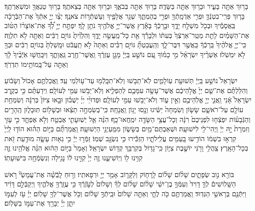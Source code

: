 \documentclass[twoside, openany, parskip=half, 11pt]{book}
\begin{document}
בָּר֥וּךְ 
אַתָּ֖ה בָּעִ֑יר וּבָר֥וּךְ אַתָּ֖ה בַּשָּׂדֶֽה׃ בָּר֥וּךְ אַתָּ֖ה בְּבֹאֶ֑ךָ וּבָר֥וּךְ אַתָּ֖ה בְּצֵאתֶֽךָ׃ בָּר֥וּךְ טַנְאֲךָ֖ וּמִשְׁאַרְתֶּֽךָ׃ בָּר֧וּךְ פְּרִֽי־בִטְנְֿךָ֛ וּפְרִ֥י אַדְמָֽתְֿךָ֖ וּפְרִ֣י בְהֶמְתֶּ֑ךָ שְׁגַ֥ר אֲלָפֶ֖יךָ וְעַשְׁתְּֿר֥וֹת צֹאנֶֽךָ׃ יְצַ֨ו יְיָ֤ אִתְּֿךָ֙ אֶת־הַבְּֿרָכָ֔ה בַּֽאֲסָמֶ֕יךָ וּבְכֹ֖ל מִשְׁלַ֣ח יָדֶ֑ךָ וּבֵ֣רַכְֿךָ֔ בָּאָ֕רֶץ אֲשֶׁר־יְיָ֥ אֱלֹהֶ֖יךָ נֹתֵ֥ן לָֽךְ׃ יִפְתַּ֣ח יְיָ֣ לְ֠ךָ֠ אֶת־אֽוֹצָר֨וֹ הַטּ֜וֹב אֶת־הַשָּׁמַ֗יִם לָתֵ֤ת מְטַֽר־אַרְצְֿךָ֙ בְּעִתּ֔וֹ וּלְבָרֵ֕ךְ אֵ֖ת כָּל־מַֽעֲשֵׂ֣ה יָדֶ֑ךָ וְהִלְוִ֨יתָ֙ גּוֹיִ֣ם רַבִּ֔ים וְאַתָּ֖ה לֹ֥א תִלְוֶֽה׃
 כִּֽי־יְיָ֤ אֱלֹהֶ֨יךָ֙ בֵּֽרַכְֿךָ֔ כַּֽאֲשֶׁ֖ר דִּבֶּר־לָ֑ךְ וְהַֽעֲבַטְתָּ֞ גּוֹיִ֣ם רַבִּ֗ים וְאַתָּה֙ לֹ֣א תַֽעֲבֹ֔ט וּמָֽשַׁלְתָּ֙ בְּגוֹיִ֣ם רַבִּ֔ים וּבְךָ֖ לֹ֥א יִמְשֹֽׁלוּ׃ 
 אַשְׁרֶ֨יךָ
  יִשְׂרָאֵ֜ל מִ֣י כָמ֗וֹךָ עַ֚ם נוֹשַׁ֣ע בַּֽיְיָ֔ מָגֵ֣ן עֶזְרֶ֔ךָ וַֽאֲשֶׁר־חֶ֖רֶב גַּֽאֲוָתֶ֑ךָ וְיִכָּֽחֲשׁ֤וּ אֹֽיְֿבֶ֨יךָ֙ לָ֔ךְ וְאַתָּ֖ה עַל־בָּֽמוֹתֵ֥ימוֹ תִדְרֹֽךְ׃


יִשְׂרָאֵל֙  נוֹשַׁ֣ע בַּֽיְיָ֔ תְּשׁוּעַ֖ת עֽוֹלָמִ֑ים לֹֽא־תֵב֥שׁוּ וְלֹֽא־תִכָּֽלְֿמ֖וּ עַד־ע֥וֹלְמֵי עַֽד׃
וַֽאֲכַלְתֶּ֤ם 
אָכוֹל֙ וְשָׂב֔וֹעַ וְהִלַּלְתֶּ֗ם אֶת־שֵׁ֤ם יְיָ֙ אֱלֹ֣הֵיכֶ֔ם אֲשֶׁר־עָשָׂ֥ה עִמָּכֶ֖ם לְהַפְלִ֑יא וְלֹֽא־יֵבֹ֥שׁוּ עַמִּ֖י לְעוֹלָֽם׃ וִֽידַעְתֶּ֗ם כִּ֣י בְקֶ֤רֶב יִשְׂרָאֵל֙ אָ֔נִי וַֽאֲנִ֛י יְיָ֥ אֱלֹֽהֵיכֶ֖ם וְאֵ֣ין ע֑וֹד וְלֹא־יֵב֥שׁוּ עַמִּ֖י לְעוֹלָֽם׃
וּפְדוּיֵ֨י 
יְיָ֜ יְשֻׁב֗וּן וּבָ֤אוּ צִיּוֹן֙ בְּרִנָּ֔ה וְשִׂמְחַ֥ת עוֹלָ֖ם עַל־רֹאשָׁ֑ם שָׂשׂ֤וֹן וְשִׂמְחָה֙ יַשִּׂ֔יגוּ וְנָ֖סוּ יָג֥וֹן וַֽאֲנָחָֽה׃
 כִּֽי־בְשִׂמְחָ֣ה 
  תֵצֵ֔אוּ וּבְשָׁל֖וֹם תּֽוּבָל֑וּן הֶֽהָרִ֣ים וְהַגְּֿבָע֗וֹת יִפְצְֿח֤וּ לִפְנֵיכֶם֙ רִנָּ֔ה וְכָל־עֲצֵ֥י הַשָּׂדֶ֖ה יִמְֽחֲאוּ־כָֽף׃
הִנֵּ֨ה
 אֵ֧ל יְשֽׁוּעָתִ֛י אֶבְטַ֖ח וְלֹ֣א אֶפְחָ֑ד כִּ֣י עָזִּ֤י וְזִמְרָת֙ יָ֣הּ יְיָ֔ וַֽיְהִי־לִ֖י לִישׁוּעָֽה׃ וּשְׁאַבְתֶּם־מַ֖יִם בְּשָׂשׂ֑וֹן מִמַּֽעַיְנֵ֖י הַיְשׁוּעָֽה׃ וַֽאֲמַרְתֶּ֞ם בַּיּ֣וֹם הַה֗וּא הוֹד֤וּ לַֽיְיָ֙ קִרְא֣וּ בִשְׁמ֔וֹ הוֹדִ֥יעוּ בָֽעַמִּ֖ים עֲלִֽילֹתָ֑יו הַזְכִּ֕ירוּ כִּ֥י נִשְׂגָּ֖ב שְׁמֽוֹ׃ זַמְּֿר֣וּ יְיָ֔ כִּ֥י גֵא֖וּת עָשָׂ֑ה מוּדַ֥עַת זֹ֖את בְּכָל־הָאָֽרֶץ׃ צַֽהֲלִ֥י וָרֹ֖נִּי יוֹשֶׁ֣בֶת צִיּ֑וֹן כִּֽי־גָד֥וֹל בְּקִרְבֵּ֖ךְ קְד֥וֹשׁ יִשְׂרָאֵֽל׃
וְאָמַר֙
 בַּיּ֣וֹם הַה֔וּא הִנֵּ֨ה אֱלֹהֵ֥ינוּ זֶ֛ה קִוִּ֥ינוּ ל֖וֹ וְיֽוֹשִׁיעֵ֑נוּ זֶ֤ה יְיָ֙ קִוִּ֣ינוּ ל֔וֹ נָגִ֥ילָה וְנִשְׂמְֿחָ֖ה בִּישֽׁוּעָתֽוֹ׃


בּוֹרֵ֖א 
נִ֣וב שְׂפָתָ֑יִם שָׁל֨וֹם שָׁל֜וֹם לָֽרָח֧וֹק וְלַקָּר֛וֹב אָמַ֥ר יְיָ֖ וּרְפָאתִֽיו׃ 
וְר֣וּחַ
 לָֽבְֿשָׁ֗ה אֶת־עֲמָשַׂי֘ רֹ֣אשׁ הַשָּֽׁלִושִׁים֒ לְךָ֤ דָוִיד֙ וְעִמְּֿךָ֣ בֶן־יִשַׁ֔י שָׁל֨וֹם שָׁל֜וֹם לְךָ֗ וְשָׁלוֹם֙ לְעֹ֣זְֿרֶ֔ךָ כִּ֥י עֲזָֽרְֿךָ֖ אֱלֹהֶ֑יךָ וַיְקַבְּֿלֵ֣ם דָּוִ֔יד וַיִּתְּֿנֵ֖ם בְּרָאשֵׁ֥י הַגְּדֽוּד׃
 וַֽאֲמַרְתֶּ֥ם
  כֹּ֖ה לֶחָ֑י וְאַתָּ֤ה שָׁלוֹם֙ וּבֵֽיתְֿךָ֣ שָׁל֔וֹם וְכֹ֥ל אֲשֶׁר־לְךָ֖ שָׁלֽוֹם׃ 
 יְיָ֗ 
 עֹ֖ז לְעַמּ֣וֹ יִתֵּ֑ן יְיָ֓ יְבָרֵ֖ךְ אֶת־עַמּ֣וֹ בַשָּׁלֽוֹם׃
\end{document}

